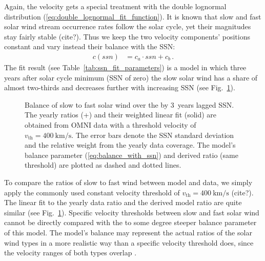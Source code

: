 Again, the velocity gets a special treatment with the double lognormal distribution (\ref{eq:double_lognormal_fit_function}). It is known that slow and fast solar wind stream occurrence rates follow the solar cycle, yet their magnitudes stay fairly stable (cite?). Thus we keep the two velocity components' positions constant and vary instead their balance with the SSN:
\begin{align}
	c(ssn) &= c_a \cdot ssn + c_b\,.	\label{eq:balance_with_ssn}
\end{align}
The fit result (see Table~\ref{tab:ssn_fit_parameters}) is a model in which three years after solar cycle minimum (SSN of zero) the slow solar wind has a share of almost two-thirds and decreases further with increasing SSN (see Fig.~\ref{fig:Vdbl_SSN_ratio_f_plot}).\\
\begin{figure}
	\caption{Balance of slow to fast solar wind over the by 3~years lagged SSN. The yearly ratios (+) and their weighted linear fit (solid) are obtained from OMNI data with a threshold velocity of $v_\text{th} = \SI{400}{\km\per\s}$. The error bars denote the SSN standard deviation and the relative weight from the yearly data coverage. The model's balance parameter (\ref{eq:balance_with_ssn}) and derived ratio (same threshold) are plotted as dashed and dotted lines.}
	\label{fig:Vdbl_SSN_ratio_f_plot}
\end{figure}
To compare the ratios of slow to fast wind between model and data, we simply apply the commonly used constant velocity threshold of $v_\text{th} = \SI{400}{\km\per\s}$ (cite?). The linear fit to the yearly data ratio and the derived model ratio are quite similar (see Fig.~\ref{fig:Vdbl_SSN_ratio_f_plot}). Specific velocity thresholds between slow and fast solar wind cannot be directly compared with the to some degree steeper balance parameter of this model. The model's balance may represent the actual ratios of the solar wind types in a more realistic way than a specific velocity threshold does, since the velocity ranges of both types overlap \citep{McGregor2011b}.


